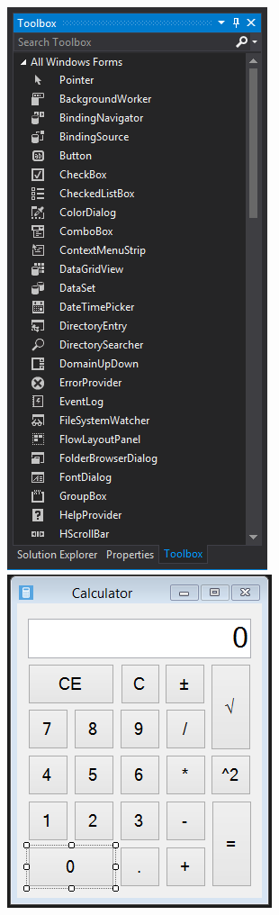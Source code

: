 \begin{center}
\includegraphics[scale=1]{images/toolbox}\\
\includegraphics[scale=1]{images/GUI}\\
\end{center}
